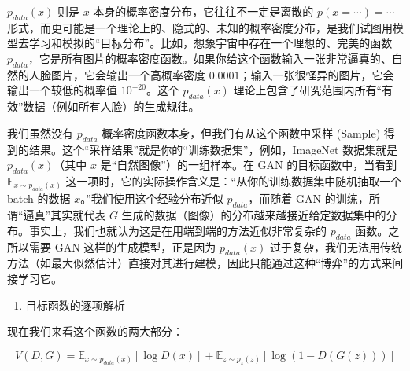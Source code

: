 \(p_{data}(x)\) 则是 \(x\) 本身的概率密度分布，它往往不一定是离散的 \(p(x=\cdots)=\cdots\) 形式，而更可能是一个理论上的、隐式的、未知的概率密度分布，是我们试图用模型去学习和模拟的``目标分布''。比如，想象宇宙中存在一个理想的、完美的函数 \(p_{data}\)，它是所有图片的概率密度函数。如果你给这个函数输入一张非常逼真的、自然的人脸图片，它会输出一个高概率密度 \(0.0001\)；输入一张很怪异的图片，它会输出一个较低的概率值 \(10^{-20}\)。这个 \(p_{data}(x)\) 理论上包含了研究范围内所有``有效''数据（例如所有人脸）的生成规律。

我们虽然没有 \(p_{data}\) 概率密度函数本身，但我们有从这个函数中采样 (Sample) 得到的结果。这个``采样结果''就是你的``训练数据集''，例如，ImageNet 数据集就是 \(p_{data}(x)\)（其中 \(x\) 是``自然图像''）的一组样本。在 GAN 的目标函数中，当看到 \(\mathbb{E}_{x\sim p_{data}(x)}\) 这一项时，它的实际操作含义是：``从你的训练数据集中随机抽取一个 batch 的数据 \(x\)。''我们使用这个经验分布近似 \(p_{data}\)，而随着 GAN 的训练，所谓``逼真''其实就代表 \(G\) 生成的数据（图像）的分布越来越接近给定数据集中的分布。事实上，我们也就认为这是在用端到端的方法近似非常复杂的 \(p_{data}\) 函数。之所以需要 GAN 这样的生成模型，正是因为 \(p_{data}(x)\) 过于复杂，我们无法用传统方法（如最大似然估计）直接对其进行建模，因此只能通过这种``博弈''的方式来间接学习它。

\begin{enumerate}
\def\labelenumi{\arabic{enumi}.}
\setcounter{enumi}{2}
\tightlist
\item
  目标函数的逐项解析
\end{enumerate}

现在我们来看这个函数的两大部分：

\[
V(D,G)=\mathbb{E}_{x\sim p_{data}(x)}[\log D(x)] + \mathbb{E}_{z\sim p_z(z)}[\log(1-D(G(z)))]
\]

